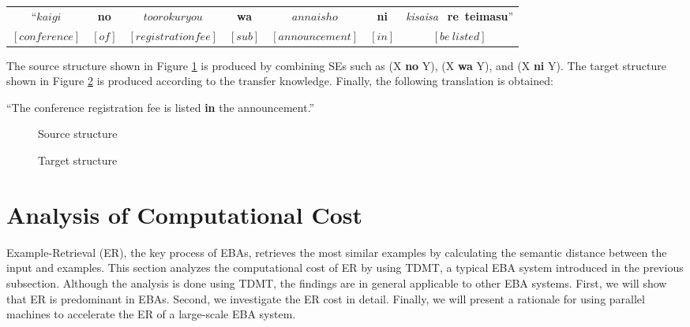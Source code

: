 \begin{center}
  \tabcolsep=1mm
  \def\arraystretch{}
  \begin{tabular}{ccccccc}
    ``$kaigi$ &         {\bf no} &      $toorokuryou$ &         {\bf wa} &
        $annaisho$ &            {\bf ni} &      {\it kisaisa\ } {\bf re\ teimasu}''\\
    $[conference]$ &    $[of]$ &        $[registration fee]$ &  $[sub]$ &
        $[announcement]$ &      $[in]$ &        $[be\ listed]$  \\[1ex] 
  \end{tabular}
\end{center}

The source structure shown in Figure 
\ref{fig:fig-source-structure} is produced 
by  combining SEs such as (X
{\bf no} Y), (X {\bf wa} Y), and (X {\bf ni} Y).
The target structure shown in Figure \ref{fig:fig-target-structure} 
is produced according to the transfer knowledge.
Finally, the following translation  is obtained:

``The conference registration fee is listed {\bf in} the announcement.''

\begin{figure}[ht]
  \begin{center}
    \caption{Source structure}
    \label{fig:fig-source-structure}
  \end{center}
\end{figure}

\begin{figure}[ht]
  \begin{center}
    \caption{Target structure}
    \label{fig:fig-target-structure}
  \end{center}
\end{figure}

\section{Analysis of Computational Cost}\label{sec-comp-cost}

Example-Retrieval (ER), the key process of EBAs, retrieves
the most similar examples by calculating the semantic distance between the
 input and examples.
This section analyzes the computational cost of ER by 
using TDMT, a typical EBA system introduced in the previous subsection.
Although the analysis is done using TDMT, the findings are in general applicable 
to other EBA systems.
First, we will show that ER is predominant in EBAs. Second, 
we investigate the ER cost in detail.
Finally, we will present a rationale for using parallel machines to
accelerate the ER of a large-scale EBA system. 

